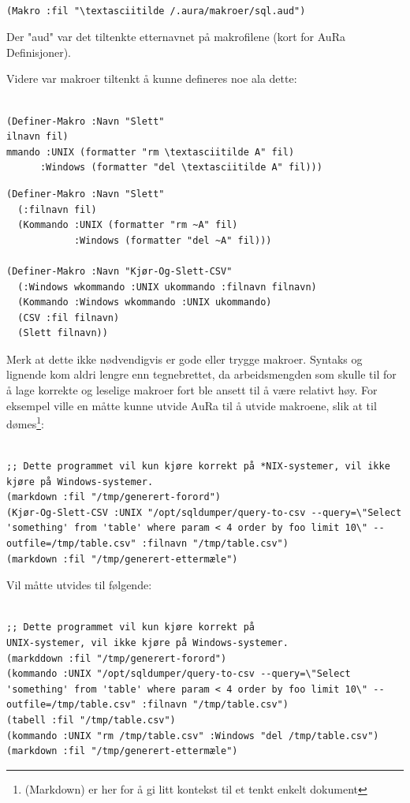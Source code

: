 \documentclass[norsk, 11pt, a4paper]{article}
\begin{document}
\begin{lstlisting}

(Makro :fil "\textasciitilde /.aura/makroer/sql.aud")
\end{lstlisting}

Der "aud" var det tiltenkte etternavnet på makrofilene (kort for AuRa Definisjoner).

Videre var makroer tiltenkt å kunne defineres noe ala dette:

\begin{lstlisting}

(Definer-Makro :Navn "Slett"
ilnavn fil)
mmando :UNIX (formatter "rm \textasciitilde A" fil)
      :Windows (formatter "del \textasciitilde A" fil))) 
\end{lstlisting}

\begin{lstlisting}
(Definer-Makro :Navn "Slett"
  (:filnavn fil)
  (Kommando :UNIX (formatter "rm ~A" fil)
            :Windows (formatter "del ~A" fil))) 

(Definer-Makro :Navn "Kjør-Og-Slett-CSV"
  (:Windows wkommando :UNIX ukommando :filnavn filnavn)
  (Kommando :Windows wkommando :UNIX ukommando)
  (CSV :fil filnavn)
  (Slett filnavn))
\end{lstlisting}

Merk at dette ikke nødvendigvis er gode eller trygge makroer. Syntaks og lignende kom aldri lengre enn tegnebrettet, da arbeidsmengden som skulle til for å lage korrekte og leselige makroer fort ble ansett til å være relativt høy.
For eksempel ville en måtte kunne utvide AuRa til å utvide makroene, slik at til dømes\footnote{(Markdown) er her for å gi litt kontekst til et tenkt enkelt dokument}:


\begin{lstlisting}

;; Dette programmet vil kun kjøre korrekt på *NIX-systemer, vil ikke kjøre på Windows-systemer.
(markdown :fil "/tmp/generert-forord")
(Kjør-Og-Slett-CSV :UNIX "/opt/sqldumper/query-to-csv --query=\"Select 'something' from 'table' where param < 4 order by foo limit 10\" --outfile=/tmp/table.csv" :filnavn "/tmp/table.csv")
(markdown :fil "/tmp/generert-ettermæle")

\end{lstlisting}

Vil måtte utvides til følgende:

\begin{lstlisting}

;; Dette programmet vil kun kjøre korrekt på 
UNIX-systemer, vil ikke kjøre på Windows-systemer.
(markddown :fil "/tmp/generert-forord")
(kommando :UNIX "/opt/sqldumper/query-to-csv --query=\"Select 'something' from 'table' where param < 4 order by foo limit 10\" --outfile=/tmp/table.csv" :filnavn "/tmp/table.csv")
(tabell :fil "/tmp/table.csv")
(kommando :UNIX "rm /tmp/table.csv" :Windows "del /tmp/table.csv")
(markdown :fil "/tmp/generert-ettermæle")

\end{lstlisting}
\end{document}
